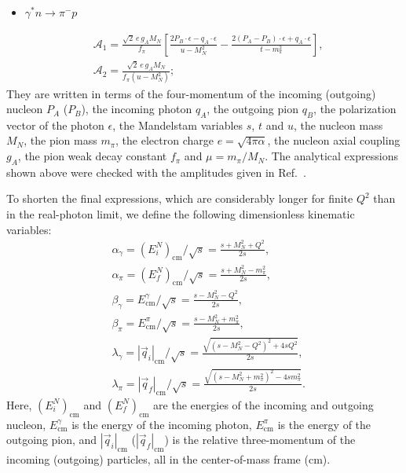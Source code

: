 \documentclass[11pt,preprint,tightenlines,
showpacs,preprintnumbers,amsmath,amssymb,superscriptaddress,a4paper,nofootinbib]{revtex4-1}
\begin{document}
\begin{itemize}
 \item $\gamma^* n \to \pi^- p$
\end{itemize}
\begin{align}
  &\mathcal{A}_1= \frac{\sqrt{2}\, e\, g_A M_N}{f_\pi}\left[\frac{2 P_B\cdot \epsilon - q_A\cdot \epsilon}{u-M_N^2}  - \frac{2 (P_A - P_B)\cdot \epsilon + q_A\cdot \epsilon}{t-m_\pi^2}\right],\\
   &\mathcal{A}_2=\frac{\sqrt{2}\, e\, g_A M_N}{f_\pi(u-M_N^2)};
\end{align}
They are written in terms of the four-momentum of the incoming (outgoing) nucleon $P_A$ ($P_B$), the incoming photon $q_A$, the outgoing pion $q_B$, the polarization vector of the photon $\epsilon$, the Mandelstam variables $s$, $t$ and $u$, the nucleon mass $M_N$, the pion mass $m_\pi$, the electron charge $e=\sqrt{4\pi \alpha}$, the nucleon axial coupling $g_A$, the pion weak decay constant $f_\pi$ and $\mu=m_\pi/M_N$. 
The analytical expressions shown above were checked with the amplitudes given in Ref.~\cite{Pasquini:2007fw}.



To shorten the final expressions, which are considerably longer for finite $Q^2$ than in the real-photon limit, we define the following dimensionless kinematic variables:
\begin{align}
&\alpha_\gamma= (E_i^{N})_\mathrm{cm}/\sqrt{s}=\frac{s+M_N^2+Q^2}{2 s},   \\
&\alpha_\pi= (E_f^{N})_\mathrm{cm}/\sqrt{s} = \frac{s+M_N^2-m_\pi^2}{2 s},  \\              
 & \beta_\gamma = E^{\gamma}_\mathrm{cm}/\sqrt{s} = \frac{s-M_N^2-Q^2}{2 s} ,  \\
 & \beta_\pi= E^{\pi}_\mathrm{cm}/\sqrt{s} = \frac{s-M_N^2+m_\pi^2}{2 s} , \\
 &\lambda_\gamma  = |\vec{q}_i|_\mathrm{cm}/\sqrt{s}= \frac{\sqrt{(s-M_N^2 - Q^2)^2+4 s Q^2}}{2 s},  \\
&\lambda_\pi =  |\vec{q}_f|_\mathrm{cm}/\sqrt{s}  = \frac{\sqrt{(s-M_N^2 + m_\pi^2)^2-4 s m_\pi^2}}{2 s}.  \end{align} 
Here, $(E_i^{N})_\mathrm{cm}$  and $(E_f^{N})_\mathrm{cm}$ are the energies of the incoming and outgoing nucleon, $E^{\gamma}_\mathrm{cm}$ is the energy of the incoming photon, $E^{\pi}_\mathrm{cm}$ is the energy of the outgoing pion, and $|\vec{q}_i|_\mathrm{cm}$ ($|\vec{q}_f|_\mathrm{cm}$) is the relative three-momentum of the incoming (outgoing) particles, all in the center-of-mass frame (cm).
\end{document}
